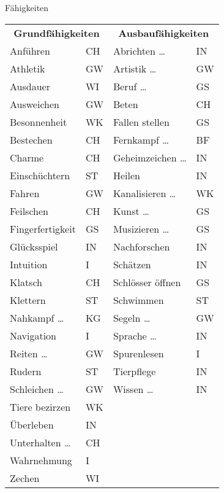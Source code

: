 \documentclass{article}
\begin{document}
\begin{multicols*}{3}
    \begin{slsframe}{Fähigkeiten}
        \begin{tabularx}{\linewidth}{llll}
            \multicolumn{2}{c}{\textbf{Grundfähigkeiten}} & \multicolumn{2}{c}{\textbf{Ausbaufähigkeiten}} \\
            Anführen                & CH & Abrichten \ldots & IN\\
            Athletik                & GW & Artistik \ldots & GW\\
            Ausdauer                & WI & Beruf \ldots & GS\\
            Ausweichen              & GW & Beten & CH \\
            Besonnenheit            & WK & Fallen stellen & GS \\
            Bestechen               & CH & Fernkampf \ldots & BF\\
            Charme                  & CH & Geheimzeichen \ldots & IN\\
            Einschüchtern           & ST & Heilen & IN \\
            Fahren                  & GW & Kanalisieren \ldots & WK  \\
            Feilschen               & CH & Kunst \ldots & GS\\
            Fingerfertigkeit        & GS & Musizieren \ldots & GS\\
            Glücksspiel             & IN & Nachforschen & IN \\
            Intuition               & I  & Schätzen & IN \\
            Klatsch                 & CH & Schlösser öffnen & GS \\
            Klettern                & ST & Schwimmen & ST \\
            Nahkampf \ldots         & KG & Segeln \ldots & GW\\
            Navigation              & I  & Sprache \ldots & IN\\
            Reiten \ldots           & GW & Spurenlesen & I \\
            Rudern                  & ST & Tierpflege & IN \\
            Schleichen \ldots       & GW & Wissen \ldots & IN  \\
            Tiere bezirzen          & WK &                       &  \\
            Überleben               & IN &                       &  \\
            Unterhalten \ldots      & CH &                       &  \\
            Wahrnehmung             & I  &                       &   \\
            Zechen                  & WI &                       &  
        
        \end{tabularx}
        \end{slsframe}


\end{multicols*}
\end{document}
